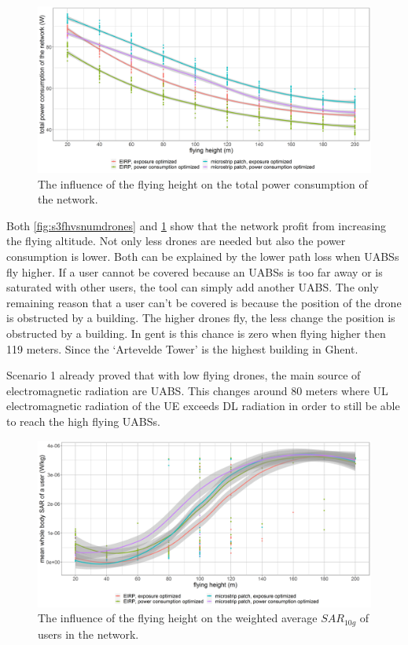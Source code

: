\begin{figure}[h!]
  \includegraphics[width=\textwidth]{../results/s3/fhvspc.png}
  \caption{The influence of the flying height on the total power consumption of the network.}
  \label{fig:s3fhvspc}
\end{figure}

Both \ref{fig:s3fhvsnumdrones} and \ref{fig:s3fhvspc} show that the network profit from increasing the flying altitude. 
Not only less drones are needed but also the power consumption is lower. Both can be explained by the lower path loss when \gls{UABS}s fly higher.
If a user cannot be covered because an \gls{UABS}s is too far away or is saturated with other users, 
the tool can simply add another \gls{UABS}. The only remaining reason that a user can’t be covered is because the position of 
the drone is obstructed by a building. The higher drones fly, the less change the position is obstructed by a building. 
In gent is this chance is zero when flying higher then 119 meters. Since the `Artevelde Tower' is the highest building in Ghent.

Scenario 1 already proved that with low flying drones, the main source of electromagnetic radiation are \gls{UABS}. 
This changes around 80 meters where \gls{UL} electromagnetic radiation of the \gls{UE}
 exceeds \gls{DL} radiation in order to still be able to reach the high flying \gls{UABS}s.

\begin{figure}[]
  \includegraphics[width=\textwidth]{../results/s3/fhvssar.png}
  \caption{The influence of the flying height on the weighted average $SAR_{10g}$ of users in the network.}
  \label{fig:s3fhvssar}
\end{figure}


